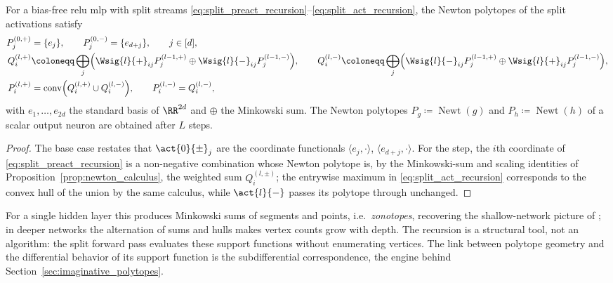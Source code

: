 \begin{corollary}\label{cor:minkowski_propagation}
For a bias-free \ac{relu} \ac{mlp} with split streams \eqref{eq:split_preact_recursion}--\eqref{eq:split_act_recursion}, the Newton polytopes of the split activations satisfy
\begin{align}
    P^{(0,+)}_j &= \{ e_j \},
    \qquad
    P^{(0,-)}_j = \{ e_{d+j} \},
    \qquad j \in [d], \notag \\
    Q^{(l,+)}_i &\coloneqq \bigoplus_j \Bigl( \Wsig{l}{+}_{ij} P^{(l-1,+)}_j \oplus \Wsig{l}{-}_{ij} P^{(l-1,-)}_j \Bigr),
    \qquad
    Q^{(l,-)}_i \coloneqq \bigoplus_j \Bigl( \Wsig{l}{-}_{ij} P^{(l-1,+)}_j \oplus \Wsig{l}{+}_{ij} P^{(l-1,-)}_j \Bigr),
    \label{eq:polytope_preact} \\
    P^{(l,+)}_i &= \operatorname{conv}\Bigl( Q^{(l,+)}_i \cup Q^{(l,-)}_i \Bigr),
    \qquad
    P^{(l,-)}_i = Q^{(l,-)}_i,
    \label{eq:polytope_act}
\end{align}
with $e_1, \dots, e_{2d}$ the standard basis of $\RR^{2d}$ and $\oplus$ the Minkowski sum. The Newton polytopes $P_g \coloneqq \operatorname{Newt}(g)$ and $P_h \coloneqq \operatorname{Newt}(h)$ of a scalar output neuron are obtained after $L$ steps.
\hfill{}
\end{corollary}

\begin{proof}
The base case restates that $\act{0}{\pm}_j$ are the coordinate functionals $\langle e_j, \cdot \rangle$, $\langle e_{d+j}, \cdot \rangle$. For the step, the $i$th coordinate of \eqref{eq:split_preact_recursion} is a non-negative combination whose Newton polytope is, by the Minkowski-sum and scaling identities of Proposition~\ref{prop:newton_calculus}, the weighted sum $Q^{(l,\pm)}_i$; the entrywise maximum in \eqref{eq:split_act_recursion} corresponds to the convex hull of the union by the same calculus, while $\act{l}{-}$ passes its polytope through unchanged.
\end{proof}

For a single hidden layer this produces Minkowski sums of segments and points, i.e.\ \emph{zonotopes}, recovering the shallow-network picture of \textcite{Zhang2018}; in deeper networks the alternation of sums and hulls makes vertex counts grow with depth. The recursion is a structural tool, not an algorithm: the split forward pass evaluates these support functions without enumerating vertices. The link between polytope geometry and the differential behavior of its support function is the subdifferential correspondence, the engine behind Section~\ref{sec:imaginative_polytopes}.

